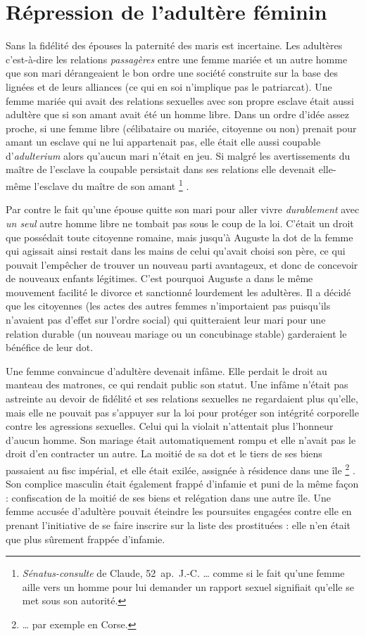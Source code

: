 \section{Répression de l'adultère féminin}

 Sans la fidélité des épouses la paternité des maris est incertaine. Les adultères c'est-à-dire les relations \emph{passagères} entre une femme mariée et un autre homme que son mari dérangeaient le bon ordre une société construite sur la base des lignées et de leurs alliances (ce qui en soi n'implique pas le patriarcat). Une femme mariée qui avait des relations sexuelles avec son propre esclave était aussi adultère que si son amant avait été un homme libre. Dans un ordre d'idée assez proche, si une femme libre (célibataire ou mariée, citoyenne ou non) prenait pour amant un esclave qui ne lui appartenait pas, elle était elle aussi coupable d'\emph{adulterium} alors qu'aucun mari n'était en jeu. Si malgré les avertissements du maître de l'esclave la coupable persistait dans ses relations elle devenait elle-même l'esclave du maître de son amant%
\footnote{\emph{Sénatus-consulte} de Claude, \mbox{52 ap. J.-C.} … comme si le fait qu'une femme aille vers un homme pour lui demander un rapport sexuel signifiait qu'elle se met sous son autorité.}%
.

 Par contre le fait qu'une épouse quitte son mari pour aller vivre \emph{durablement} avec \emph{un seul} autre homme libre ne tombait pas sous le coup de la loi. C'était un droit que possédait toute citoyenne romaine, mais jusqu'à Auguste la dot de la femme qui agissait ainsi restait dans les mains de celui qu'avait choisi son père, ce qui pouvait l'empêcher de trouver un nouveau parti avantageux, et donc de concevoir de nouveaux enfants légitimes. C'est pourquoi Auguste a dans le même mouvement facilité le divorce et sanctionné lourdement les adultères. Il a décidé que les citoyennes (les actes des autres femmes n'importaient pas puisqu'ils n'avaient pas d'effet sur l'ordre social) qui quitteraient leur mari pour une relation durable (un nouveau mariage ou un concubinage stable) garderaient le bénéfice de leur dot. 

 Une femme convaincue d'adultère devenait infâme. Elle perdait le droit au manteau des matrones, ce qui rendait public son statut. Une infâme n'était pas astreinte au devoir de fidélité et ses relations sexuelles ne regardaient plus qu'elle, mais elle ne pouvait pas s'appuyer sur la loi pour protéger son intégrité corporelle contre les agressions sexuelles. Celui qui la violait n'attentait plus l'honneur d'aucun homme. Son mariage était automatiquement rompu et elle n'avait pas le droit d'en contracter un autre. La moitié de sa dot et le tiers de ses biens passaient au fisc impérial, et elle était exilée, assignée à résidence dans une île%
\footnote{… par exemple en Corse.}%
. Son complice masculin était également frappé d'infamie et puni de la même façon : confiscation de la moitié de ses biens et relégation dans une autre île. Une femme accusée d'adultère pouvait éteindre les poursuites engagées contre elle en prenant l'initiative de se faire inscrire sur la liste des prostituées : elle n'en était que plus sûrement frappée d'infamie. 

